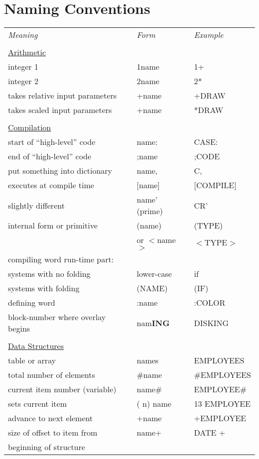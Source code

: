 \section{Naming Conventions}
\begin{tabular}{lll}
{}{\setlength{\parsep}{0cm}}
{\em Meaning}&{\em Form}&{\em Example}\\
\\
\underline{Arithmetic}\\
integer 1&1name&1+\\
integer 2&2name&2*\\
takes relative input parameters&+name&+DRAW\\
takes scaled input parameters&+name&*DRAW\\
\\
\underline{Compilation}\\
start of ``high-level'' code&name:&CASE:\\
end of ``high-level'' code&;name&;CODE\\
put something into dictionary&name,&C,\\
executes at compile time&[name]&[COMPILE]\\
slightly different&name' (prime)&CR'\\
internal form or primitive&(name)&(TYPE)\\
&or \(<\)name\(>\)&\(<\)TYPE\(>\)\\
compiling word run-time part:\\
 systems with no folding&lower-case&if\\
 systems with folding&(NAME)&(IF)\\
defining word&:name&:COLOR\\
block-number where overlay begins&nam{\bf ING}&DISKING\\
\\
\underline{Data Structures}\\
table or array&names&EMPLOYEES\\
total number of elements&\#name&\#EMPLOYEES\\
current item number (variable)&name\#&EMPLOYEE\#\\
sets current item&( n) name&13 EMPLOYEE\\
advance to next element&+name&+EMPLOYEE\\
size of offset to item from&name+&DATE +\\
beginning of structure\\

\end{tabular}
